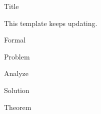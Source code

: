 \documentclass{ctexart}
\begin{document}
\pagestyle{empty}
\begin{center}\large Title\end{center}
This template keeps updating.
\begin{formal}Formal\end{formal}
\begin{problem}Problem\end{problem}
\begin{analyze}Analyze\end{analyze}
\begin{solution}Solution\end{solution}
\begin{theorem}Theorem\end{theorem}
\end{document}
